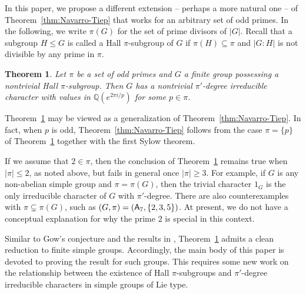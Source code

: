 \documentclass[12pt]{amsart}
\newtheorem{theorema}{Theorem}
\theoremstyle{definition}
\numberwithin{equation}{section}
\newcommand{\QQ}{{\mathbb Q}}
\newcommand{\Al}{\textup{\textsf{A}}}
\begin{document}
In this paper, we propose a different %
extension -- perhaps %
a more
natural %
one -- of %
Theorem~\ref{thm:Navarro-Tiep} that works for
an arbitrary set of odd primes. In the following, we write $\pi(G)$
for the set of prime divisors of $|G|$. Recall that a subgroup $H\le
G$ is called %
a Hall $\pi$-subgroup of %
$G$ if $\pi(H)\subseteq \pi$
and $|G:H|$ is not divisible by any prime in $\pi$.

\begin{theorema}\label{thm:main}
Let $\pi$ be a set of odd primes and $G$ a finite group possessing a
nontrivial Hall $\pi$-subgroup. Then $G$ has a nontrivial
$\pi'$-degree irreducible character with values in $\QQ(e^{2\pi
i/p})$ for some $p\in\pi$.
\end{theorema}



Theorem~\ref{thm:main} may be viewed as a generalization of
Theorem~\ref{thm:Navarro-Tiep}. In fact, when $p$ is odd,
Theorem~\ref{thm:Navarro-Tiep} follows from the case $\pi=\{p\}$ of
Theorem~\ref{thm:main} together with the first Sylow theorem.

If we assume that $2\in \pi$, then the conclusion of
Theorem~\ref{thm:main} remains true when $|\pi|\leq 2$, as noted
above, but fails in general once $|\pi|\geq 3$. For example, if $G$
is any non-abelian simple group and $\pi=\pi(G)$, then the trivial
character $1_G$ is the only irreducible character of $G$ with
$\pi'$-degree. There are also counterexamples with $\pi\varsubsetneq
\pi(G)$, such as $(G,\pi)=(\Al_7,\{2,3,5\})$. At present, we do not
have a conceptual explanation %
for why the prime $2$ is special in
this context.

Similar to Gow's conjecture and the results in
\cite{Navarro-Tiep1,GHSV21}, Theorem~\ref{thm:main} admits a clean
reduction to finite simple groups. Accordingly, the main body of
this paper is devoted to proving the result for such groups. This
requires some new work on the relationship between the existence %
of
Hall $\pi$-subgroups and %
$\pi'$-degree irreducible characters in
simple groups of Lie %
type.
\end{document}
